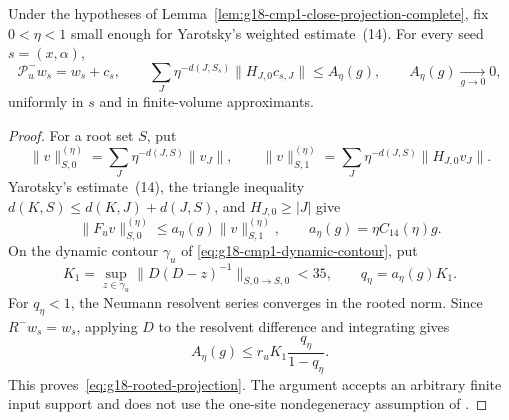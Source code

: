 \begin{lemma}
\label{lem:g18-rooted-shell-dressing}
Under the hypotheses of
Lemma~\ref{lem:g18-cmp1-close-projection-complete}, fix $0<\eta<1$ small
enough for Yarotsky's weighted estimate~(14).  For every seed
$s=(x,\alpha)$,
\begin{equation}
 \mathcal P_u^-w_s=w_s+c_s,\qquad
 \sum_J\eta^{-d(J,S_s)}
       \|H_{J,0}c_{s,J}\|
 \le A_\eta(g),
 \qquad A_\eta(g)\xrightarrow[g\to0]{}0 ,
 \label{eq:g18-rooted-projection}
\end{equation}
uniformly in $s$ and in finite-volume approximants.
\end{lemma}

\begin{proof}
For a root set $S$, put
\[
 \|v\|_{S,0}^{(\eta)}
 =\sum_J\eta^{-d(J,S)}\|v_J\|,
 \qquad
 \|v\|_{S,1}^{(\eta)}
 =\sum_J\eta^{-d(J,S)}\|H_{J,0}v_J\|.
\]
Yarotsky's estimate~(14), the triangle inequality
$d(K,S)\le d(K,J)+d(J,S)$, and $H_{J,0}\ge |J|$ give
\[
 \|F_uv\|_{S,0}^{(\eta)}
 \le a_\eta(g)\|v\|_{S,1}^{(\eta)},
 \qquad a_\eta(g)=\eta C_{14}(\eta)g.
\]
On the dynamic contour $\gamma_u$ of
\eqref{eq:g18-cmp1-dynamic-contour}, put
\[
 K_1=\sup_{z\in\gamma_u}
 \|D(D-z)^{-1}\|_{S,0\to S,0}<35,
 \qquad q_\eta=a_\eta(g)K_1.
\]
For $q_\eta<1$, the Neumann resolvent series converges in the rooted norm.
Since $R^-w_s=w_s$, applying $D$ to the resolvent difference and integrating
gives
\[
 A_\eta(g)\le r_uK_1\frac{q_\eta}{1-q_\eta}.
\]
This proves~\eqref{eq:g18-rooted-projection}.  The argument accepts an
arbitrary finite input support and does not use the one-site nondegeneracy
assumption of \cite[Theorem~4]{Yarotsky2004QP}.
\end{proof}

